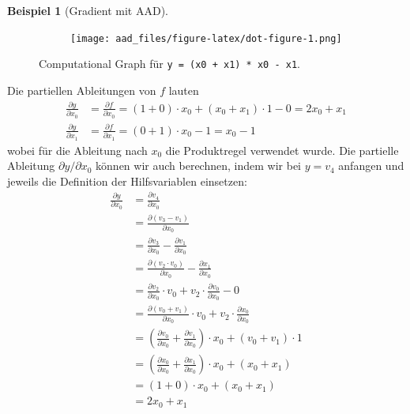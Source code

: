 \documentclass[
  a4paper,
  DIV=11]{scrreprt}
\theoremstyle{definition}
\theoremstyle{definition}
\newtheorem{example}{Beispiel}[chapter]
\theoremstyle{remark}
\begin{document}
\begin{example}[Gradient mit
AAD]
\begin{figure}
{\begin{figure}[H]
{\centering \texttt{[image: aad\_files/figure-latex/dot-figure-1.png]}

}

\end{figure}

}

\caption{\label{fig-compTreeMulti}Computational Graph für
\texttt{y\ =\ (x0\ +\ x1)\ *\ x0\ -\ x1}.}

\end{figure}

Die partiellen Ableitungen von \(f\) lauten \[
\begin{align*}
    \frac{\partial y}{\partial x_0} &= \frac{\partial f}{\partial x_0} = (1+0)\cdot x_0 + (x_0 + x_1)\cdot 1 - 0=2x_0 + x_1 \\
    \frac{\partial y}{\partial x_1} &= \frac{\partial f}{\partial x_1} = (0 + 1)\cdot x_0 - 1 = x_0 - 1
\end{align*}
\] wobei für die Ableitung nach \(x_0\) die Produktregel verwendet
wurde. Die partielle Ableitung \(\partial y / \partial x_0\) können wir
auch berechnen, indem wir bei \(y = v_4\) anfangen und jeweils die
Definition der Hilfsvariablen einsetzen: \[
\begin{align*}
    \frac{\partial y}{\partial x_0} &= \frac{\partial v_4}{\partial x_0} \\
    &= \frac{\partial (v_3 - v_1)}{\partial x_0} \\
    &= \frac{\partial v_3}{\partial x_0} - \frac{\partial v_1}{\partial x_0} \\
    &= \frac{\partial (v_2 \cdot v_0)}{\partial x_0} - \frac{\partial x_1}{\partial x_0} \\
    &= \frac{\partial v_2}{\partial x_0} \cdot v_0 + v_2 \cdot \frac{\partial v_0}{\partial x_0} - 0 \\
    &= \frac{\partial (v_0 + v_1)}{\partial x_0} \cdot v_0 + v_2 \cdot \frac{\partial x_0}{\partial x_0} \\
    &= \left( \frac{\partial v_0}{\partial x_0} + \frac{\partial v_1}{\partial x_0} \right) \cdot x_0 + (v_0 + v_1) \cdot 1 \\
    &= \left( \frac{\partial x_0}{\partial x_0} + \frac{\partial x_1}{\partial x_0} \right) \cdot x_0 + (x_0 + x_1) \\
    &= (1 + 0) \cdot x_0 + (x_0 + x_1) \\
    &= 2x_0 + x_1   
\end{align*}
\]


\end{example}
\end{document}
